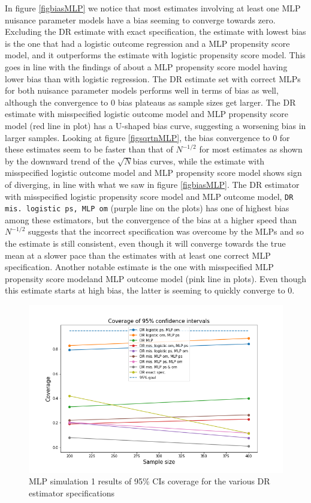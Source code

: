 \documentclass[12pt,twoside]{article}
\begin{document}
In figure \ref{figbiasMLP} we notice that most estimates involving at least one MLP nuisance parameter models have a bias seeming to converge towards zero. Excluding the DR estimate with exact specification, the estimate with lowest bias is the one that had a logistic outcome regression and a MLP propensity score model, and it outperforms the estimate with logistic propensity score model. This goes in line with the findings of \citet{setoguchi-nn} about a MLP propensity score model having lower bias than with logistic regression. The DR estimate set with correct MLPs for both nuisance parameter models performs well in terms of bias as well, although the convergence to 0 bias plateaus as sample sizes get larger. The DR estimate with misspecified logistic outcome model and MLP propensity score model (red line in plot) has a U-shaped bias curve, suggesting a worsening bias in larger samples. Looking at figure \ref{figsqrtnMLP}, the bias convergence to 0 for these estimates seem to be faster than that of $N^{-1/2}$ for most estimates as shown by the downward trend of the $\sqrt{N}$bias curves, while the estimate with misspecified logistic outcome model and MLP propensity score model shows sign of diverging, in line with what we saw in figure \ref{figbiasMLP}. The DR estimator with misspecified logistic propensity score model and MLP outcome model, \texttt{DR mis. logistic ps, MLP om} (purple line on the plots) has one of highest bias among these estimators, but the convergence of the bias at a higher speed than $N^{-1/2}$ suggests that the incorrect specification was overcome by the MLPs and so the estimate is still consistent, even though it will converge towards the true mean at a slower pace than the estimates with at least one correct MLP specification. Another notable estimate is the one with misspecified MLP propensity score modeland MLP outcome model (pink line in plots). Even though this estimate starts at high bias, the latter is seeming to quickly converge to 0.

\begin{figure}[h!]
    \centering
    \includegraphics[width = 0.9\columnwidth]{figures/CIMLP.png}
    \caption{MLP simulation 1 results of 95\% CIs coverage for the various DR estimator specifications}
    \label{figCIMLP}
\end{figure}
\end{document}
